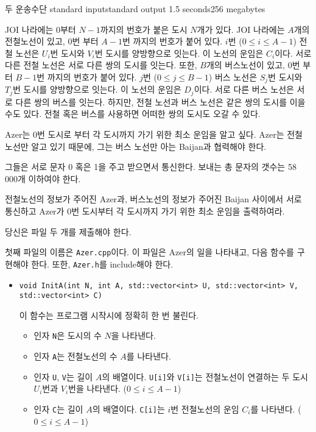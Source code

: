 \begin{problem}{두 운송수단}
	{standard input}{standard output}
	{1.5 seconds}{256 megabytes}{}
	
	JOI 나라에는 0부터 $N-1$까지의 번호가 붙은 도시 $N$개가 있다. JOI 나라에는 $A$개의 전철노선이 있고, 0번 부터 $A-1$번 까지의 번호가 붙어 있다. $i$번 ($0 \le i \le A-1$) 전철 노선은 $U_i$번 도시와 $V_i$번 도시를 양방향으로 잇는다. 이 노선의 운임은 $C_i$이다. 서로 다른 전철 노선은 서로 다른 쌍의 도시를 잇는다.
	또한, $B$개의 버스노선이 있고, 0번 부터 $B-1$번 까지의 번호가 붙어 있다. $j$번 ($0 \le j\le B-1$) 버스 노선은 $S_j$번 도시와 $T_j$번 도시를 양방향으로 잇는다. 이 노선의 운임은 $D_j$이다. 서로 다른 버스 노선은 서로 다른 쌍의 버스를 잇는다. 하지만, 전철 노선과 버스 노선은 같은 쌍의 도시를 이을수도 있다. 전철 혹은 버스를 사용하면 어떠한 쌍의 도시도 오갈 수 있다.
	
	Azer는 0번 도시로 부터 각 도시까지 가기 위한 최소 운임을 알고 싶다. Azer는 전철 노선만 알고 있기 때문에, 그는 버스 노선만 아는 Baijan과 협력해야 한다.
	
	그들은 서로 문자 0 혹은 1을 주고 받으면서 통신한다. 보내는 총 문자의 갯수는 58 000개 이하여야 한다.
	
	전철노선의 정보가 주어진 Azer과, 버스노선의 정보가 주어진 Baijan 사이에서 서로 통신하고 Azer가 0번 도시부터 각 도시까지 가기 위한 최소 운임을 출력하여라.
	
	\Specification
	
	당신은 파일 두 개를 제출해야 한다.
	
	첫째 파일의 이름은 \texttt{Azer.cpp}이다. 이 파일은 Azer의 일을 나타내고, 다음 함수를 구현해야 한다. 또한, \texttt{Azer.h}를 include해야 한다.

	\begin{itemize}
		\item \texttt{void InitA(int N, int A, std::vector<int> U, std::vector<int> V, std::vector<int> C)}
		
		이 함수는 프로그램 시작시에 정확히 한 번 불린다.
		\begin{itemize}
			\item 인자 \texttt{N}은 도시의 수 $N$을 나타낸다.
			\item 인자 \texttt{A}는 전철노선의 수 $A$를 나타낸다.
			\item 인자 \texttt{U}, \texttt{V}는 길이 $A$의 배열이다. \texttt{U[i]}와 \texttt{V[i]}는 전철노선이 연결하는 두 도시 $U_i$번과 $V_i$번을 나타낸다. ($0 \le i \le A-1$)
			\item 인자 \texttt{C}는 길이 $A$의 배열이다. \texttt{C[i]}는 $i$번 전철노선의 운임 $C_i$를 나타낸다. ($0 \le i \le A-1$)
		\end{itemize}
		

\end{itemize}
\end{problem}
